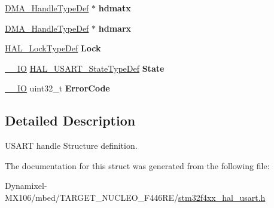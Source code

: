 \begin{DoxyCompactItemize}
\item 
\hyperlink{group___d_m_a___exported___types_ga41b754a906b86bce54dc79938970138b}{D\+M\+A\+\_\+\+Handle\+Type\+Def} $\ast$ {\bfseries hdmatx}\hypertarget{struct_u_s_a_r_t___handle_type_def_adf15bfbda4f94c71681ed72865169d87}{}\label{struct_u_s_a_r_t___handle_type_def_adf15bfbda4f94c71681ed72865169d87}

\item 
\hyperlink{group___d_m_a___exported___types_ga41b754a906b86bce54dc79938970138b}{D\+M\+A\+\_\+\+Handle\+Type\+Def} $\ast$ {\bfseries hdmarx}\hypertarget{struct_u_s_a_r_t___handle_type_def_ae1954304e362afb014a2fdd6185a6766}{}\label{struct_u_s_a_r_t___handle_type_def_ae1954304e362afb014a2fdd6185a6766}

\item 
\hyperlink{stm32f4xx__hal__def_8h_ab367482e943333a1299294eadaad284b}{H\+A\+L\+\_\+\+Lock\+Type\+Def} {\bfseries Lock}\hypertarget{struct_u_s_a_r_t___handle_type_def_aa690e34ab215cecc79e776cb8ba8ce05}{}\label{struct_u_s_a_r_t___handle_type_def_aa690e34ab215cecc79e776cb8ba8ce05}

\item 
\hyperlink{core__sc300_8h_aec43007d9998a0a0e01faede4133d6be}{\+\_\+\+\_\+\+IO} \hyperlink{group___u_s_a_r_t___exported___types_ga502e7abdfa6b24f0f6b40cf60c7383c5}{H\+A\+L\+\_\+\+U\+S\+A\+R\+T\+\_\+\+State\+Type\+Def} {\bfseries State}\hypertarget{struct_u_s_a_r_t___handle_type_def_a0a6bb879f9ca2459494926c53cea3f75}{}\label{struct_u_s_a_r_t___handle_type_def_a0a6bb879f9ca2459494926c53cea3f75}

\item 
\hyperlink{core__sc300_8h_aec43007d9998a0a0e01faede4133d6be}{\+\_\+\+\_\+\+IO} uint32\+\_\+t {\bfseries Error\+Code}\hypertarget{struct_u_s_a_r_t___handle_type_def_a7137395e43b7bd79e1746500cd3e83d5}{}\label{struct_u_s_a_r_t___handle_type_def_a7137395e43b7bd79e1746500cd3e83d5}

\end{DoxyCompactItemize}


\subsection{Detailed Description}
U\+S\+A\+RT handle Structure definition. 

The documentation for this struct was generated from the following file\+:\begin{DoxyCompactItemize}
\item 
Dynamixel-\/\+M\+X106/mbed/\+T\+A\+R\+G\+E\+T\+\_\+\+N\+U\+C\+L\+E\+O\+\_\+\+F446\+R\+E/\hyperlink{stm32f4xx__hal__usart_8h}{stm32f4xx\+\_\+hal\+\_\+usart.\+h}\end{DoxyCompactItemize}
